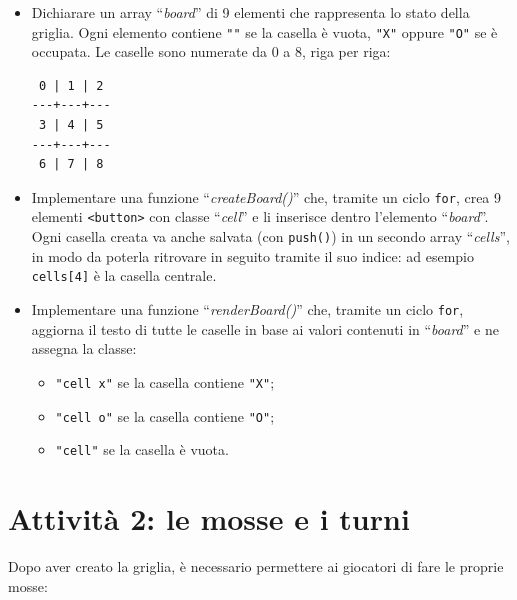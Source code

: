 \documentclass[a4paper,11pt]{article}
\newcommand{\elem}[1]{``\textit{#1}''}
\begin{document}
\begin{itemize}
    \item Dichiarare un array \elem{board} di 9 elementi che rappresenta lo
    stato della griglia. Ogni elemento contiene \texttt{""} se la casella è
    vuota, \texttt{"X"} oppure \texttt{"O"} se è occupata. Le caselle sono
    numerate da 0 a 8, riga per riga:

\begin{lstlisting}
 0 | 1 | 2
---+---+---
 3 | 4 | 5
---+---+---
 6 | 7 | 8
\end{lstlisting}

    \item Implementare una funzione \elem{createBoard()} che, tramite un ciclo
    \texttt{for}, crea 9 elementi \texttt{<button>} con classe \elem{cell} e li
    inserisce dentro l'elemento \elem{board}. Ogni casella creata va anche
    salvata (con \texttt{push()}) in un secondo array \elem{cells}, in modo
    da poterla ritrovare in seguito tramite il suo indice: ad esempio
    \texttt{cells[4]} è la casella centrale.

    \item Implementare una funzione \elem{renderBoard()} che, tramite un ciclo
    \texttt{for}, aggiorna il testo di tutte le caselle in base ai valori
    contenuti in \elem{board} e ne assegna la classe:
    \begin{itemize}
        \item[--] \texttt{"cell x"} se la casella contiene \texttt{"X"};
        \item[--] \texttt{"cell o"} se la casella contiene \texttt{"O"};
        \item[--] \texttt{"cell"} se la casella è vuota.
    \end{itemize}
\end{itemize}

\section*{Attività 2: le mosse e i turni}

Dopo aver creato la griglia, è necessario permettere ai giocatori di fare le
proprie mosse:
\end{document}
